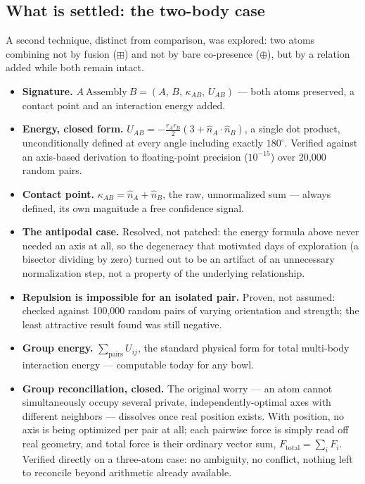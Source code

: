 \documentclass[12pt, a4paper]{article}
\begin{document}
\subsection{What is settled: the two-body case}
\label{subsec:assembly_settled}
A second technique, distinct from comparison, was explored: two
atoms combining not by fusion ($\boxplus$) and not by bare
co-presence ($\oplus$), but by a relation added while both remain
intact.
\begin{itemize}
\item \textbf{Signature.} $A\ \mathrm{Assembly}\ B =
      (A,\,B,\,\kappa_{AB},\,U_{AB})$ --- both atoms preserved, a
      contact point and an interaction energy added.
\item \textbf{Energy, closed form.}
      $U_{AB} = -\tfrac{r_A r_B}{2}(3+\hat n_A\cdot\hat n_B)$, a
      single dot product, unconditionally defined at every angle
      including exactly $180^\circ$. Verified against an
      axis-based derivation to floating-point precision
      ($10^{-15}$) over 20{,}000 random pairs.
\item \textbf{Contact point.} $\kappa_{AB}=\hat n_A+\hat n_B$, the
      raw, unnormalized sum --- always defined, its own magnitude a
      free confidence signal.
\item \textbf{The antipodal case.} Resolved, not patched: the
      energy formula above never needed an axis at all, so the
      degeneracy that motivated days of exploration (a bisector
      dividing by zero) turned out to be an artifact of an
      unnecessary normalization step, not a property of the
      underlying relationship.
\item \textbf{Repulsion is impossible for an isolated pair.} Proven,
      not assumed: checked against 100{,}000 random pairs of varying
      orientation and strength; the least attractive result found
      was still negative.
\item \textbf{Group energy.} $\sum_{\text{pairs}} U_{ij}$, the
      standard physical form for total multi-body interaction
      energy --- computable today for any bowl.
\item \textbf{Group reconciliation, closed.} The original worry ---
      an atom cannot simultaneously occupy several private,
      independently-optimal axes with different neighbors ---
      dissolves once real position exists. With position, no axis
      is being optimized per pair at all; each pairwise force is
      simply read off real geometry, and total force is their
      ordinary vector sum, $F_{\text{total}}=\sum_i F_i$. Verified
      directly on a three-atom case: no ambiguity, no conflict,
      nothing left to reconcile beyond arithmetic already available.
\end{itemize}
\end{document}
